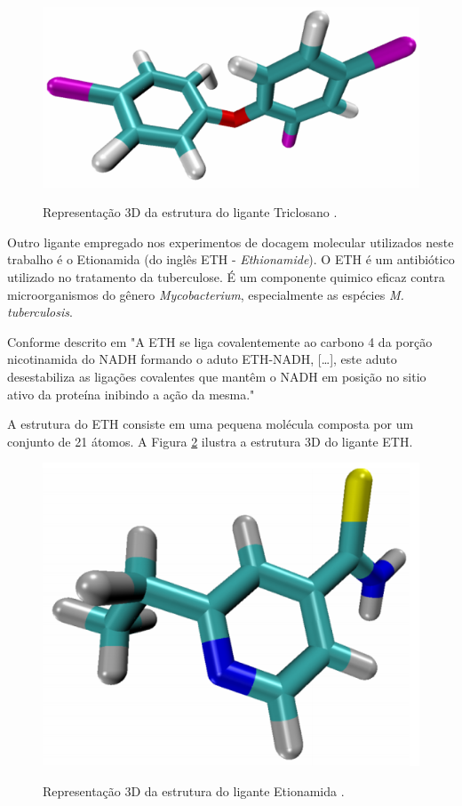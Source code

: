 \begin{figure}[h]
	\center
	\includegraphics[width=14cm]{images/tcl.png}
	\label{fig:tcl}
	\caption{Representação 3D da estrutura do ligante Triclosano \cite{kar11}.}
\end{figure}

Outro ligante empregado nos experimentos de docagem molecular utilizados neste trabalho é o Etionamida (do inglês ETH - \emph{Ethionamide}). O ETH é um antibiótico utilizado no tratamento da tuberculose. É um componente quimico eficaz contra microorganismos do gênero \emph{Mycobacterium}, especialmente as espécies \emph{M. tuberculosis}. 

Conforme descrito em \cite{COH10} "A ETH se liga covalentemente ao carbono 4 da porção nicotinamida do NADH formando o aduto ETH-NADH, […], este aduto desestabiliza as ligações covalentes que mantêm o NADH em posição no sitio ativo da proteína inibindo a ação da mesma."

A estrutura do ETH consiste em uma pequena molécula composta por um conjunto de 21 átomos. A Figura \ref{fig:eth} ilustra a estrutura 3D do ligante ETH.

\begin{figure}[h]
	\center
	\includegraphics[width=14cm]{images/eth.png}
	\label{fig:eth}
	\caption{Representação 3D da estrutura do ligante Etionamida \cite{kar11}.}
\end{figure}

